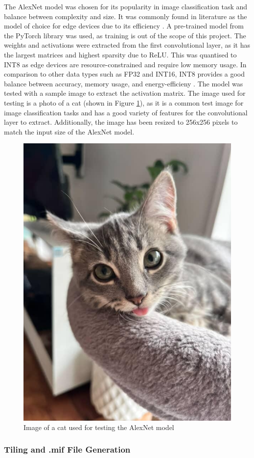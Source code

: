 \documentclass[12pt, a4paper, ukenglish]{article}
\newcommand{\catImage}{
    \begin{figure}[ht]
        \centering
        \includegraphics[width=0.3\linewidth]{figures/cat.jpg}
        \caption{Image of a cat used for testing the AlexNet model}
        \label{fig:cat}
    \end{figure}
}
\begin{document}
        The AlexNet model was chosen for its popularity in image classification task and balance between complexity and size. It was commonly found in literature as the model of choice for edge devices due to its efficiency \cite{parashar_scnn_2017,sun_sense_2023}. A pre-trained model from the PyTorch library was used, as training is out of the scope of this project. The weights and activations were extracted from the first convolutional layer, as it has the largest matrices and highest sparsity due to ReLU. This was quantised to INT8 as edge devices are resource-constrained and require low memory usage. In comparison to other data types such as FP32 and INT16, INT8 provides a good balance between accuracy, memory usage, and energy-efficieny \cite{gorvadiya_energy_2025}. The model was tested with a sample image to extract the activation matrix. The image used for testing is a photo of a cat (shown in Figure \ref{fig:cat}), as it is a common test image for image classification tasks and has a good variety of features for the convolutional layer to extract. Additionally, the image has been resized to 256x256 pixels to match the input size of the AlexNet model.

        \catImage
     

        \subsubsection{Tiling and .mif File Generation}\label{sec: tiling}
        
\end{document}
